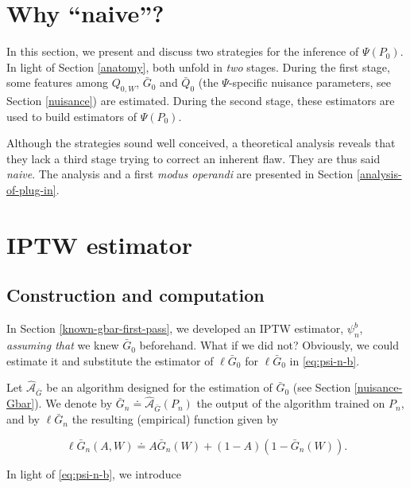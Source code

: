 \documentclass[11pt,openright,twoside]{book}
\newcommand{\Algo}{\widehat{\mathcal{A}}}
\newcommand{\defq}{\doteq}
\newcommand{\Gbar}{\bar{G}}
\newcommand{\Qbar}{\bar{Q}}
\theoremstyle{definition}
\theoremstyle{definition}
\theoremstyle{definition}
\theoremstyle{remark}
\begin{document}
\hypertarget{why-naive}{%
\section{Why ``naive''?}\label{why-naive}}

In this section, we present and discuss two strategies for the inference of
\(\Psi(P_{0})\). In light of Section \ref{anatomy}, both unfold in \emph{two}
stages. During the first stage, some features among \(Q_{0,W}\), \(\Gbar_{0}\)
and \(\Qbar_{0}\) (the \(\Psi\)-specific nuisance parameters, see Section
\ref{nuisance}) are estimated. During the second
stage, these estimators are used to build estimators of \(\Psi(P_{0})\).

Although the strategies sound well conceived, a theoretical analysis reveals
that they lack a third stage trying to correct an inherent flaw. They are thus
said \emph{naive}. The analysis and a first \emph{modus operandi} are presented in
Section \ref{analysis-of-plug-in}.

\hypertarget{known-gbar-second-pass}{%
\section{IPTW estimator}\label{known-gbar-second-pass}}

\hypertarget{unknown-gbar-constr}{%
\subsection{Construction and computation}\label{unknown-gbar-constr}}

In Section \ref{known-gbar-first-pass}, we developed an IPTW estimator,
\(\psi_{n}^{b}\), \emph{assuming that} we knew \(\Gbar_{0}\) beforehand. What if we
did not? Obviously, we could estimate it and substitute the estimator of
\(\ell\Gbar_{0}\) for \(\ell\Gbar_{0}\) in \eqref{eq:psi-n-b}.

Let \(\Algo_{\Gbar}\) be an algorithm designed for the estimation of \(\Gbar_{0}\)
(see Section \ref{nuisance-Gbar}). We denote by \(\Gbar_{n} \defq \Algo_{\Gbar}(P_{n})\) the output of the algorithm trained on \(P_{n}\), and by
\(\ell\Gbar_{n}\) the resulting (empirical) function given by

\begin{equation*}
\ell\Gbar_{n}(A,W) \defq A \Gbar_{n}(W) + (1-A) (1 - \Gbar_{n}(W)).
\end{equation*}

In light of \eqref{eq:psi-n-b}, we introduce
\end{document}
